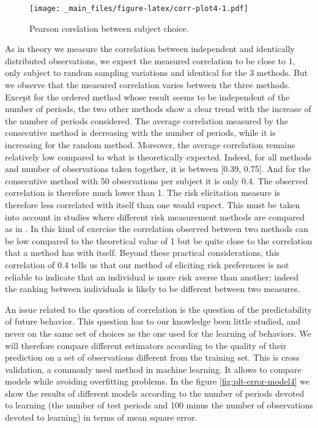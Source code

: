 \documentclass[
]{book}
\begin{document}
\begin{figure}
\centering
\texttt{[image: \_main\_files/figure-latex/corr-plot4-1.pdf]}
\caption{\label{fig:corr-plot4}Pearson corelation between subject choice.}
\end{figure}

As in theory we measure the correlation between independent and
identically distributed observations,
we expect the measured correlation
to be close to 1, only subject to random sampling variations and
identical for the 3 methods.
But we observe that the measured
correlation varies between the three methods. Except for the ordered
method whose result seems to be independent of the number of periods,
the two other methods show a clear trend with the increase of the number
of periods considered. The average correlation measured by the consecutive method
is decreasing with the number of periods, while it is increasing for the
random method. Moreover, the average correlation remains relatively low
compared to what is theoretically expected. Indeed, for all methods and
number of observations taken together, it is between
{[}0.39, 0.75{]}. And
for the consecutive method with 50 observations per subject it is only
0.4.
The observed correlation is therefore much lower than 1.
The risk elicitation measure is therefore less correlated with itself than one
would expect.
This must be taken into account in studies where different risk measurement
methods are compared as in \citet{crosetto2016theoretical}.
In this kind of exercise the correlation observed between two methods can be low
compared to the theoretical value of 1 but be quite close to the correlation
that a method has with itself.
Beyond these practical considerations, this correlation of
0.4
tells us that our method of eliciting risk preferences is not reliable to
indicate that an individual is more risk averse than another;
indeed the ranking between individuals is likely to be different between two
measures.

An issue related to the question of correlation is the question of the
predictability of future behavior.
This question has to our knowledge been little studied, and never on the same
set of choices as the one used for the learning of behaviors.
We will therefore compare different estimators according to the quality of their
prediction on a set of observations different from the training set.
This is cross validation, a commonly used method in machine learning.
It allows to compare models while avoiding overfitting problems.
In the figure \ref{fig:plt-error-model4} we show the
results of different models according to the number of periods devoted
to learning (the number of test periods and 100 minus the number of
observations devoted to learning) in terms of mean square error.
\end{document}
